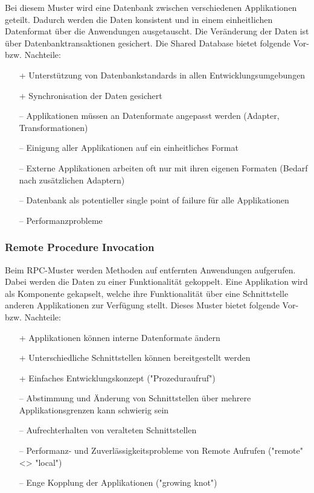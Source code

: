 Bei diesem Muster wird eine Datenbank zwischen verschiedenen Applikationen geteilt. Dadurch werden die Daten konsistent und in einem einheitlichen Datenformat über die Anwendungen ausgetauscht. Die Veränderung der Daten ist über Datenbanktransaktionen gesichert. Die Shared Database bietet folgende Vor- bzw. Nachteile:
\begin{itemize}
	\item[+] Unterstützung von Datenbankstandards in allen Entwicklungsumgebungen
	\item[+] Synchronisation der Daten gesichert
	\item[--] Applikationen müssen an Datenformate angepasst werden (Adapter, Transformationen)
	\item[--] Einigung aller Applikationen auf ein einheitliches Format
	\item[--] Externe Applikationen arbeiten oft nur mit ihren eigenen Formaten (Bedarf nach zusätzlichen Adaptern)
	\item[--] Datenbank als potentieller single point of failure für alle Applikationen
	\item[--] Performanzprobleme
\end{itemize}

\subsubsection{Remote Procedure Invocation}

Beim RPC-Muster werden Methoden auf entfernten Anwendungen aufgerufen. Dabei werden die Daten zu einer Funktionalität gekoppelt. Eine Applikation wird als Komponente gekapselt, welche ihre Funktionalität über eine Schnittstelle anderen Applikationen zur Verfügung stellt. Dieses Muster bietet folgende Vor- bzw. Nachteile:
\begin{itemize}
	\item[+] Applikationen können interne Datenformate ändern
	\item[+] Unterschiedliche Schnittstellen können bereitgestellt werden
	\item[+] Einfaches Entwicklungskonzept ("Prozeduraufruf")
	\item[--] Abstimmung und Änderung von Schnittstellen über mehrere Applikationsgrenzen kann schwierig sein
	\item[--] Aufrechterhalten von veralteten Schnittstellen
	\item[--] Performanz- und Zuverlässigkeitsprobleme von Remote Aufrufen ("remote" <> "local")
	\item[--] Enge Kopplung der Applikationen ("growing knot")
\end{itemize}

